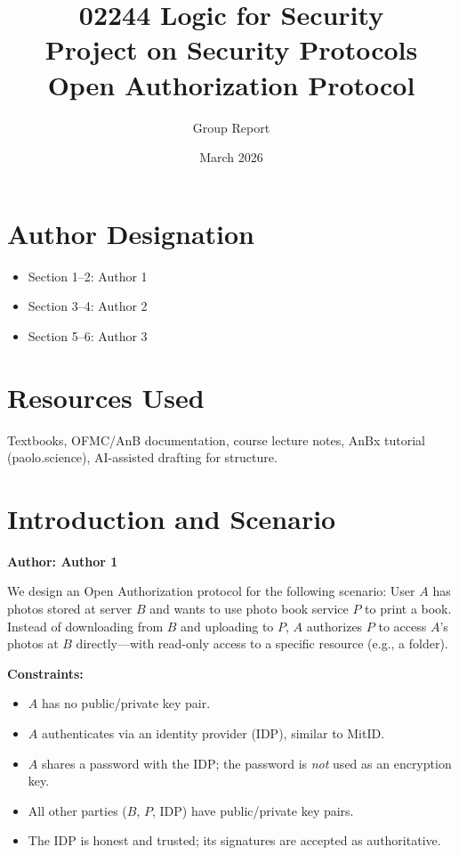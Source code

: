 \documentclass[11pt,a4paper]{article}
\title{02244 Logic for Security\\Project on Security Protocols\\Open Authorization Protocol}
\author{Group Report}
\date{March 2026}
\begin{document}
\maketitle

\section*{Author Designation}
\begin{itemize}
  \item Section 1--2: Author 1
  \item Section 3--4: Author 2
  \item Section 5--6: Author 3
\end{itemize}

\section*{Resources Used}
Textbooks, OFMC/AnB documentation, course lecture notes, AnBx tutorial (paolo.science), AI-assisted drafting for structure.

\hrulefill

\section{Introduction and Scenario}
\textbf{Author: Author 1}

We design an Open Authorization protocol for the following scenario: User $A$ has photos stored at server $B$ and wants to use photo book service $P$ to print a book. Instead of downloading from $B$ and uploading to $P$, $A$ authorizes $P$ to access $A$'s photos at $B$ directly---with read-only access to a specific resource (e.g., a folder).

\textbf{Constraints:}
\begin{itemize}
  \item $A$ has no public/private key pair.
  \item $A$ authenticates via an identity provider (IDP), similar to MitID.
  \item $A$ shares a password with the IDP; the password is \emph{not} used as an encryption key.
  \item All other parties ($B$, $P$, IDP) have public/private key pairs.
  \item The IDP is honest and trusted; its signatures are accepted as authoritative.
\end{itemize}

\hrulefill
\end{document}
